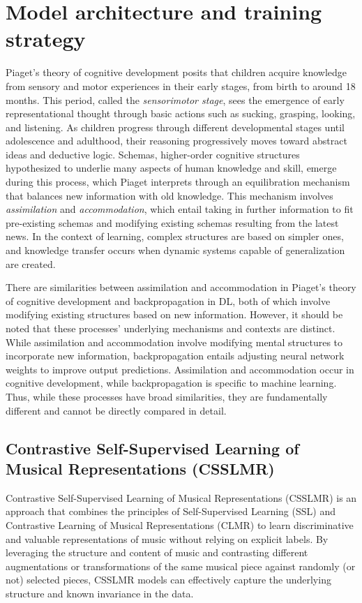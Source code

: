 \section{Model architecture and training strategy}
Piaget's theory of cognitive development \cite{Piagets_Theory_of_Cognitive_Development} posits that children acquire knowledge from sensory and motor experiences in their early stages, from birth to around 18 months. This period, called the \textit{sensorimotor stage}, sees the emergence of early representational thought through basic actions such as sucking, grasping, looking, and listening. As children progress through different developmental stages until adolescence and adulthood, their reasoning progressively moves toward abstract ideas and deductive logic. Schemas, higher-order cognitive structures hypothesized to underlie many aspects of human knowledge and skill, emerge during this process, which Piaget interprets through an equilibration mechanism that balances new information with old knowledge. This mechanism involves \textit{assimilation} and \textit{accommodation}, which entail taking in further information to fit pre-existing schemas and modifying existing schemas resulting from the latest news. In the context of learning, complex structures are based on simpler ones, and knowledge transfer occurs when dynamic systems capable of generalization are created. \cite{audioselfsupsurvey}

There are similarities between assimilation and accommodation in Piaget's theory of cognitive development and backpropagation in DL, both of which involve modifying existing structures based on new information. However, it should be noted that these processes' underlying mechanisms and contexts are distinct. While assimilation and accommodation involve modifying mental structures to incorporate new information, backpropagation entails adjusting neural network weights to improve output predictions. Assimilation and accommodation occur in cognitive development, while backpropagation is specific to machine learning. Thus, while these processes have broad similarities, they are fundamentally different and cannot be directly compared in detail.

\subsection{Contrastive Self-Supervised Learning of Musical Representations (CSSLMR)}

Contrastive Self-Supervised Learning of Musical Representations (CSSLMR) is an approach that combines the principles of Self-Supervised Learning (SSL) \cite{audioselfsupsurvey} and Contrastive Learning of Musical Representations (CLMR) \cite{CLMR2021} to learn discriminative and valuable representations of music without relying on explicit labels. By leveraging the structure and content of music and contrasting different augmentations or transformations of the same musical piece against randomly (or not) selected pieces, CSSLMR models can effectively capture the underlying structure and known invariance in the data.

